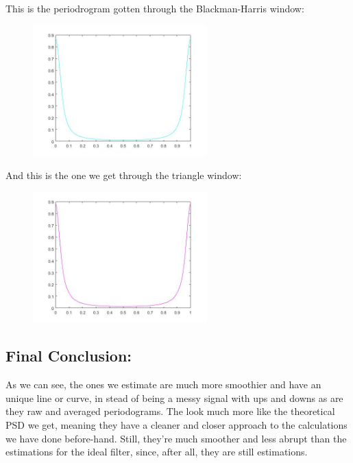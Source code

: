\documentclass[a4paper,11pt]{article}
\begin{document}
\newpage

This is the periodrogram gotten through the Blackman-Harris window:

\begin{figure}[!hp]
    \begin{center}
    \includegraphics[width=0.6\textwidth]{images/lab2_figure12.jpg}
    \end{center}
\end{figure}

And this is the one we get through the triangle window:

\begin{figure}[!hp]
    \begin{center}
    \includegraphics[width=0.6\textwidth]{images/lab2_figure14.jpg}
    \end{center}
\end{figure}

\newpage

\subsection{Final Conclusion:}

As we can see, the ones we estimate are much more smoothier and have an unique line or curve, in stead of being a messy signal with ups and downs as are they raw and averaged periodograms. The look much more like the theoretical PSD we get, meaning they have a cleaner and closer approach to the calculations we have done before-hand. Still, they're much smoother and less abrupt than the estimations for the ideal filter, since, after all, they are still estimations.
\end{document}
